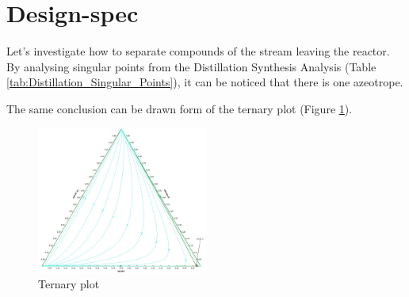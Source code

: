 \section{Design-spec}

Let's investigate how to separate compounds of the stream leaving the reactor. By analysing singular points from the Distillation Synthesis Analysis (Table \ref{tab:Distillation_Singular_Points}), it can be noticed that there is one azeotrope.

\begin{table}[h!]
	\centering
	\caption{Singular points from the Distillation Synthesis Analysis}
	\label{tab:Distillation_Singular_Points}
\end{table}

The same conclusion can be drawn form of the ternary plot (Figure \ref{fig:Ester_Teranry}).

\begin{figure}[H]
	\centering
	\includegraphics[width=0.5\textwidth]{Figures/Proces_Analysis/Distillation.jpg}
	\caption{Ternary plot}
	\label{fig:Ester_Teranry}
\end{figure}

